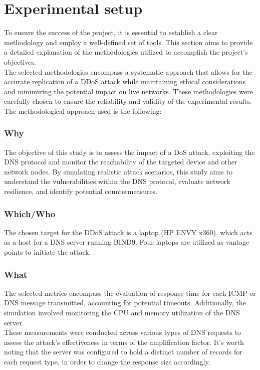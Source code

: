 \section{Experimental setup}

To ensure the success of the project, it is essential to establish a clear methodology and employ a well-defined set of tools.
This section aims to provide a detailed explanation of the methodologies utilized to accomplish the project's objectives.\\
The selected methodologies encompass a systematic approach that allows for the accurate replication of a
DDoS attack while maintaining ethical considerations and minimizing the potential impact on live networks.
These methodologies were carefully chosen to ensure the reliability and validity of the experimental results.
The methodological approach used is the following:

\subsubsection*{Why}
The objective of this study is to assess the impact of a DoS attack, exploiting the DNS protocol and monitor the reachability
of the targeted device and other network nodes.
By simulating realistic attack scenarios, this study aims to understand the vulnerabilities within the DNS protocol, evaluate network resilience,
and identify potential countermeasures.

\subsubsection*{Which/Who}
The chosen target for the DDoS attack is a laptop (HP ENVY x360), which acts as a host for a DNS server running BIND9.
Four laptops are utilized as vantage points to initiate the attack.

\subsubsection*{What}
The selected metrics encompass the evaluation of response time for each ICMP or DNS message transmitted, accounting for potential timeouts.
Additionally, the simulation involved monitoring the CPU and memory utilization of the DNS server.\\
These measurements were conducted across various types of DNS requests to assess the attack's effectiveness in terms of the amplification factor.
It's worth noting that the server was configured to hold a distinct number of records for each request type, in order to change the response size accordingly.


